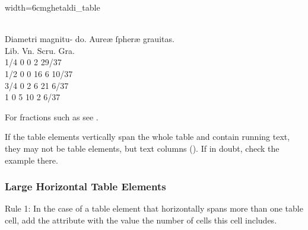 \vspace{3mm}
\begin{sampleImageSmall}{width=6cm}{ghetaldi_table}
\begin{typeLatin}
 \\
Diametri  magnitu-  do. \lwr{} Aureæ ſpheræ  grauitas. \\
 Lib.  Vn.  Scru.  Gra. \\
 1/4  0  0 \lwr{} 2  29/37 \\
 1/2  0  0 \lwr{} 16  6  10/37 \\
 3/4  0  2 \lwr{} 6  21  6/37  \\
1  0  5  10  \lwr{} 2  6/37\\
\end{typeLatin}
\end{sampleImageSmall}

\begin{crossref}
For fractions such as  see .
\end{crossref}

\vspace{3mm}
\begin{note}
If the table elements vertically span the whole table and contain running text, they may not be table elements, but text columns (). If in doubt, check the example there.
\end{note}

\subsubsection{Large Horizontal Table Elements}
\label{section large horizontal table elements}
\begin{mainrule}
  Rule 1: In the case of a table element that horizontally spans more than one table cell, add the attribute  with the value the number of cells this cell includes.
\end{mainrule}


